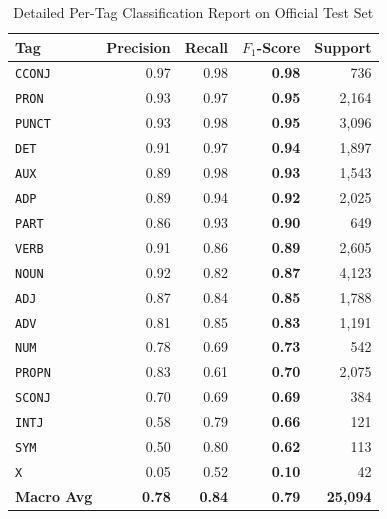 \documentclass[conference]{IEEEtran}
\begin{document}
\begin{table}[htbp]
\caption{Detailed Per-Tag Classification Report on Official Test Set}
\label{tab:per_tag}
\centering
\begin{tabular}{lrrrr}
\toprule
\textbf{Tag} & \textbf{Precision} & \textbf{Recall} & \textbf{$F_1$-Score} & \textbf{Support} \\
\midrule
\texttt{CCONJ} & 0.97 & 0.98 & \textbf{0.98} & 736 \\
\texttt{PRON}  & 0.93 & 0.97 & \textbf{0.95} & 2,164 \\
\texttt{PUNCT} & 0.93 & 0.98 & \textbf{0.95} & 3,096 \\
\texttt{DET}   & 0.91 & 0.97 & \textbf{0.94} & 1,897 \\
\texttt{AUX}   & 0.89 & 0.98 & \textbf{0.93} & 1,543 \\
\texttt{ADP}   & 0.89 & 0.94 & \textbf{0.92} & 2,025 \\
\texttt{PART}  & 0.86 & 0.93 & \textbf{0.90} & 649 \\
\texttt{VERB}  & 0.91 & 0.86 & \textbf{0.89} & 2,605 \\
\texttt{NOUN}  & 0.92 & 0.82 & \textbf{0.87} & 4,123 \\
\texttt{ADJ}   & 0.87 & 0.84 & \textbf{0.85} & 1,788 \\
\texttt{ADV}   & 0.81 & 0.85 & \textbf{0.83} & 1,191 \\
\texttt{NUM}   & 0.78 & 0.69 & \textbf{0.73} & 542 \\
\texttt{PROPN} & 0.83 & 0.61 & \textbf{0.70} & 2,075 \\
\texttt{SCONJ} & 0.70 & 0.69 & \textbf{0.69} & 384 \\
\texttt{INTJ}  & 0.58 & 0.79 & \textbf{0.66} & 121 \\
\texttt{SYM}   & 0.50 & 0.80 & \textbf{0.62} & 113 \\
\texttt{X}     & 0.05 & 0.52 & \textbf{0.10} & 42 \\
\midrule
\textbf{Macro Avg} & \textbf{0.78} & \textbf{0.84} & \textbf{0.79} & \textbf{25,094} \\
\bottomrule
\end{tabular}
\end{table}
\end{document}

